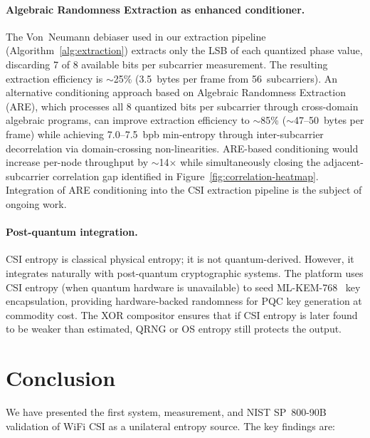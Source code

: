 \paragraph{Algebraic Randomness Extraction as enhanced conditioner.}
The Von~Neumann debiaser used in our extraction pipeline (Algorithm~\ref{alg:extraction}) extracts only the LSB of each quantized phase value, discarding 7 of 8 available bits per subcarrier measurement.
The resulting extraction efficiency is $\sim$25\% (3.5~bytes per frame from 56~subcarriers).
An alternative conditioning approach based on Algebraic Randomness Extraction (ARE), which processes all 8 quantized bits per subcarrier through cross-domain algebraic programs, can improve extraction efficiency to $\sim$85\% ($\sim$47--50~bytes per frame) while achieving 7.0--7.5~bpb min-entropy through inter-subcarrier decorrelation via domain-crossing non-linearities.
ARE-based conditioning would increase per-node throughput by $\sim$14$\times$ while simultaneously closing the adjacent-subcarrier correlation gap identified in Figure~\ref{fig:correlation-heatmap}.
Integration of ARE conditioning into the CSI extraction pipeline is the subject of ongoing work.

\paragraph{Post-quantum integration.}
CSI entropy is classical physical entropy; it is not quantum-derived.
However, it integrates naturally with post-quantum cryptographic systems.
The \zipminator platform uses CSI entropy (when quantum hardware is unavailable) to seed ML-KEM-768~\cite{nist2024fips203} key encapsulation, providing hardware-backed randomness for PQC key generation at commodity cost.
The XOR compositor ensures that if CSI entropy is later found to be weaker than estimated, QRNG or OS entropy still protects the output.


\section{Conclusion}
\label{sec:conclusion}

We have presented the first system, measurement, and NIST SP~800-90B validation of WiFi CSI as a unilateral entropy source.
The key findings are:

